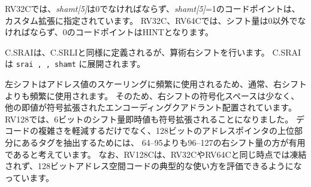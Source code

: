 \begin{comment}
For RV32C, {\em shamt[5]} must be zero; the code points with {\em shamt[5]}=1
are designated for custom extensions.  For RV32C and RV64C, the shift
amount must be non-zero; the code points with {\em shamt}=0 are HINTs.
\end{comment}
RV32Cでは、{\em shamt[5]}は0でなければならず、{\em shamt[5]}=1のコードポイントは、カスタム拡張に指定されています。
RV32C、RV64Cでは、シフト量は0以外でなければならず、0のコードポイントはHINTとなります。

\begin{comment}
C.SRAI is defined analogously to C.SRLI, but instead performs an arithmetic
right shift.
C.SRAI expands to {\tt srai \rdprime, \rdprime, shamt}.
\end{comment}
C.SRAIは、C.SRLIと同様に定義されるが、算術右シフトを行います。
C.SRAIは {\tt srai \rdprime, \rdprime, shamt} に展開されます。


\begin{commentary}
\begin{comment}
Left shifts are usually more frequent than right shifts, as left
shifts are frequently used to scale address values.  Right shifts have
therefore been granted less encoding space and are placed in an
encoding quadrant where all other immediates are sign-extended.  For
RV128, the decision was made to have the 6-bit shift-amount immediate
also be sign-extended.  Apart from reducing the decode complexity, we
believe right-shift amounts of 96--127 will be more useful than 64--95,
to allow extraction of tags located in the high portions of 128-bit
address pointers.  We note that RV128C will not be frozen at the same
point as RV32C and RV64C, to allow evaluation of typical usage of
128-bit address-space codes.
\end{comment}
左シフトはアドレス値のスケーリングに頻繁に使用されるため、通常、右シフトよりも頻繁に使用されます。
そのため、右シフトの符号化スペースは少なく、他の即値が符号拡張されたエンコーディングクアドラント配置されています。
RV128では、6ビットのシフト量即時値も符号拡張されることになりました。
デコードの複雑さを軽減するだけでなく、128ビットのアドレスポインタの上位部分にあるタグを抽出するためには、
64--95よりも96--127の右シフト量の方が有用であると考えています。
なお、RV128Cは、RV32CやRV64Cと同じ時点では凍結されず、128ビットアドレス空間コードの典型的な使い方を評価できるようになっています。
\end{commentary}

